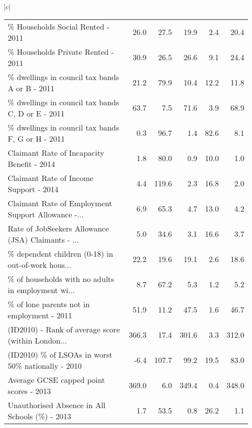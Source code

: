 \documentclass[conference]{IEEEtran}
\begin{document}
\begin{figure*}[ht!]
{\begin{tabular}{|c|}
\begin{table*}[t]
\begin{tabular}{lrrrrr}
\% Households Social Rented - 2011                  &           26.0 &       27.5 &           19.9 &        2.4 &    20.4 \\
\% Households Private Rented - 2011                 &           30.9 &       26.5 &           26.6 &        9.1 &    24.4 \\
\% dwellings in council tax bands A or B - 2011     &           21.2 &       79.9 &           10.4 &       12.2 &    11.8 \\
\% dwellings in council tax bands C, D or E - 2011  &           63.7 &        7.5 &           71.6 &        3.9 &    68.9 \\
\% dwellings in council tax bands F, G or H - 2011  &            0.3 &       96.7 &            1.4 &       82.6 &     8.1 \\
Claimant Rate of Incapacity Benefit - 2014         &            1.8 &       80.0 &            0.9 &       10.0 &     1.0 \\
Claimant Rate of Income Support - 2014             &            4.4 &      119.6 &            2.3 &       16.8 &     2.0 \\
Claimant Rate of Employment Support Allowance -... &            6.9 &       65.3 &            4.7 &       13.0 &     4.2 \\
Rate of JobSeekers Allowance (JSA) Claimants - ... &            5.0 &       34.6 &            3.1 &       16.6 &     3.7 \\
\% dependent children (0-18) in out-of-work hous... &           22.2 &       19.6 &           19.1 &        2.6 &    18.6 \\
\% of households with no adults in employment wi... &            8.7 &       67.2 &            5.3 &        1.2 &     5.2 \\
\% of lone parents not in employment - 2011         &           51.9 &       11.2 &           47.5 &        1.6 &    46.7 \\
(ID2010) - Rank of average score (within London... &          366.3 &       17.4 &          301.6 &        3.3 &   312.0 \\
(ID2010) \% of LSOAs in worst 50\% nationally - 2010 &           -6.4 &      107.7 &           99.2 &       19.5 &    83.0 \\
Average GCSE capped point scores - 2013            &          369.0 &        6.0 &          349.4 &        0.4 &   348.0 \\
Unauthorised Absence in All Schools (\%) - 2013     &            1.7 &       53.5 &            0.8 &       26.2 &     1.1 \\

\end{tabular}
\end{table*}
\end{tabular}}
\end{figure*}
\end{document}
